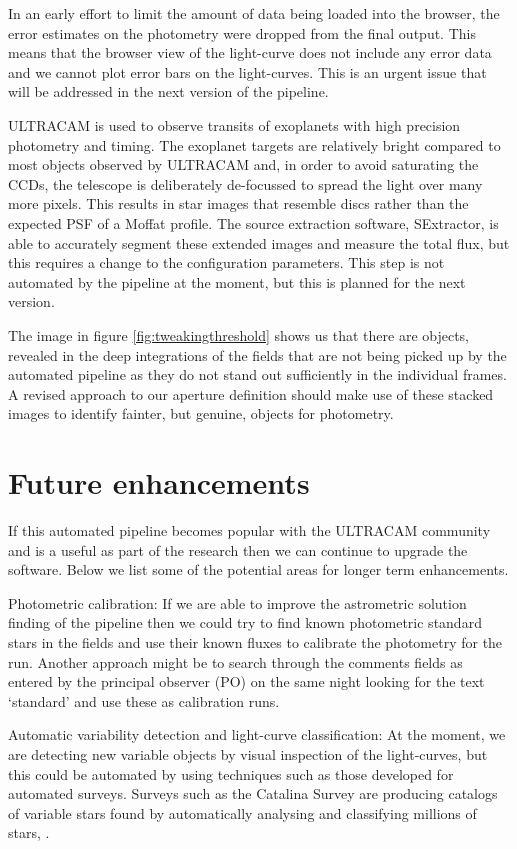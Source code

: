 In an early effort to limit the amount of data being loaded into the browser, the error estimates on the photometry were dropped from the final output. This means that the browser view of the light-curve does not include any error data and we cannot plot error bars on the light-curves. This is an urgent issue that will be addressed in the next version of the pipeline. 

ULTRACAM is used to observe transits of exoplanets with high precision photometry and timing. The exoplanet targets are relatively bright compared to most objects observed by ULTRACAM and, in order to avoid saturating the CCDs, the telescope is deliberately de-focussed to spread the light over many more pixels. This results in star images that resemble discs rather than the expected PSF of a Moffat profile. The source extraction software, SExtractor, is able to accurately segment these extended images and measure the total flux, but this requires a change to the configuration parameters. This step is not automated by the pipeline at the moment, but this is planned for the next version. 

The image in figure \ref{fig:tweakingthreshold} shows us that there are objects, revealed in the deep integrations of the fields that are not being picked up by the automated pipeline as they do not stand out sufficiently in the individual frames. A revised approach to our aperture definition should make use of these stacked images to identify fainter, but genuine, objects for photometry. 

\section{Future enhancements}
If this automated pipeline becomes popular with the ULTRACAM community and is a useful as part of the research then we can continue to upgrade the software. Below we list some of the potential areas for longer term enhancements.

{Photometric calibration}: If we are able to improve the astrometric solution finding of the pipeline then we could try to find known photometric standard stars in the fields and use their known fluxes to calibrate the photometry for the run. Another approach might be to search through the comments fields as entered by the principal observer (PO) on the same night looking for the text `standard' and use these as calibration runs. 

{Automatic variability detection and light-curve classification}: At the moment, we are detecting new variable objects by visual inspection of the light-curves, but this could be automated by using techniques such as those developed for automated surveys. Surveys such as the Catalina Survey are producing catalogs of variable stars found by automatically analysing and classifying millions of stars, \citep{CatalinaCatalog}.

